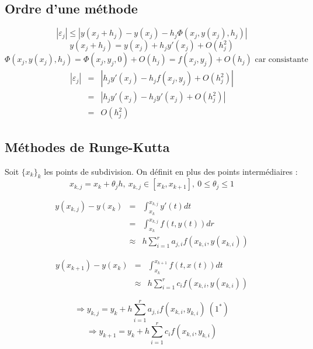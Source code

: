 \subsection{Ordre d'une méthode}


\begin{dem}
	\[|\varepsilon_j|\leq |y(x_j+h_j)-y(x_j)-h_j\Phi(x_j, y(x_j), h_j)|\]
	\[y(x_j+h_j)=y(x_j)+h_jy'(x_j)+O(h_j^2)\]
	\[\Phi(x_j,y(x_j),h_j)=\Phi(x_j, y_j,0)+O(h_j)=f(x_j, y_j)+O(h_j) \text{ car consistante}\]
	\begin{eqnarray*}
		|\varepsilon_j|&=&|h_jy'(x_j)-h_jf(x_j,y_j)+O(h_j^2)|\\
				&=& |h_jy'(x_j)-h_jy'(x_j)+O(h_j^2)|\\
				&=& O(h_j^2)
	\end{eqnarray*}
\end{dem}

\subsection{Méthodes de Runge-Kutta}
Soit $\{x_k\}_k$ les points de subdivision. On définit en plus des points intermédiaires :
\[x_{k,j}=x_k+\theta_j h,\ x_{k,j}\in[x_k,x_{k+1}],\ 0\leq \theta_j\leq 1\]

\begin{eqnarray*}
	y(x_{k,j})-y(x_k)&=&\int_{x_k}^{x_{k,j}} y'(t)dt \\
			&=& \int_{x_k}^{x_{k,j}} f(t,y(t)) dr\\
			&\approx& h\sum_{i=1}^r a_{j,i} f(x_{k,i},y(x_{k,i}))
\end{eqnarray*}

\begin{eqnarray*}
	y(x_{k+1})-y(x_k)&=&\int_{x_k}^{x_{k+1}} f(t,x(t)) dt \\
			&\approx& h\sum_{i=1}^r c_i f(x_{k,i},y(x_{k,i}))
\end{eqnarray*}

\[\Rightarrow y_{k,j}=y_k+h\sum_{i=1}^r a_{j,i}f(x_{k,i},y_{k,i})\ (1^*)\]
\[\Rightarrow y_{k+1}=y_k+h\sum_{i=1}^r c_i f(x_{k,i}, y_{k,i})\]

